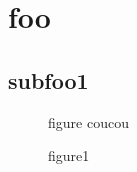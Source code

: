 \documentclass{article}
\begin{document}


\section{foo}


\locallistoffigures

\subsection{subfoo1}

\begin{figure}[htbp]
  \centering
  figure coucou
  \caption{figure1}
\end{figure}
\end{document}
